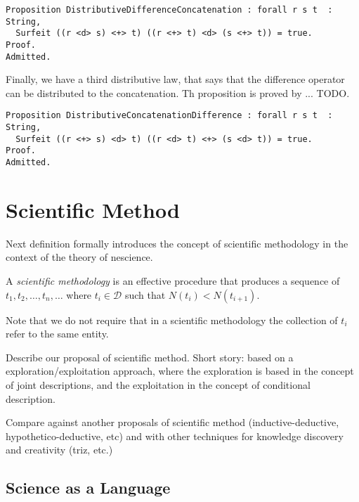 \begin{sourcecode}
{\scriptsize \begin{verbatim}
Proposition DistributiveDifferenceConcatenation : forall r s t  : String,
  Surfeit ((r <d> s) <+> t) ((r <+> t) <d> (s <+> t)) = true.
Proof.
Admitted.
\end{verbatim}}
\end{sourcecode}

Finally, we have a third distributive law, that says that the difference operator can be distributed to the concatenation. Th proposition is proved by ... {\color{red} TODO}.

\begin{sourcecode}
{\scriptsize \begin{verbatim}
Proposition DistributiveConcatenationDifference : forall r s t  : String,
  Surfeit ((r <+> s) <d> t) ((r <d> t) <+> (s <d> t)) = true.
Proof.
Admitted.
\end{verbatim}}
\end{sourcecode}

%
%

\section{Scientific Method}

Next definition formally introduces the concept of scientific methodology in the context of the theory of nescience.

\begin{definition}
A \emph{scientific methodology} is an effective procedure that produces a sequence of $t_1, t_2, \ldots, t_n, \ldots$ where $t_i \in \mathcal{D}$ such that $N(t_i) < N(t_{i+1})$.
\end{definition}

Note that we do not require that in a scientific methodology the collection of $t_i$ refer to the same entity.


{\color{red} Describe our proposal of scientific method. Short story: based on a exploration/exploitation approach, where the exploration is based in the concept of joint descriptions, and the exploitation in the concept of conditional description.}

{\color{red} Compare against another proposals of scientific method (inductive-deductive, hypothetico-deductive, etc) and with other techniques for knowledge discovery and creativity (triz, etc.)}

\subsection{Science as a Language}

